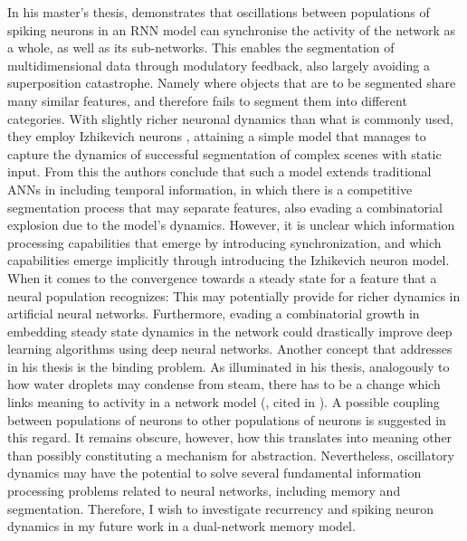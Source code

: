 In his master's thesis, \cite{Solbakken2009} demonstrates that oscillations between populations of spiking neurons in an RNN model can synchronise the activity of the network as a whole, as well as its sub-networks. This enables the segmentation of multidimensional data through modulatory feedback, also largely avoiding a superposition catastrophe. Namely where objects that are to be segmented share many similar features, and therefore fails to segment them into different categories. With slightly richer neuronal dynamics than what is commonly used, they employ Izhikevich neurons \citep{Izhikevich2003}, attaining a simple model that manages to capture the dynamics of successful segmentation of complex scenes with static input. From this the authors conclude that such a model extends traditional ANNs in including temporal information, in which there is a competitive segmentation process that may separate features, also evading a combinatorial explosion due to the model's dynamics. However, it is unclear which information processing capabilities that emerge by introducing synchronization, and which capabilities emerge implicitly through introducing the Izhikevich neuron model. When it comes to the convergence towards a steady state for a feature that a neural population recognizes: This may potentially provide for richer dynamics in artificial neural networks. Furthermore, evading a combinatorial growth in embedding steady state dynamics in the network could drastically improve deep learning algorithms using deep neural networks. Another concept that \cite{Solbakken2009} addresses in his thesis is the binding problem. As illuminated in his thesis, analogously to how water droplets may condense from steam,  there has to be a change which links meaning to activity in a network model (\cite{Freeman2003}, cited in \cite{Solbakken2009}). A possible coupling between populations of neurons to other populations of neurons is suggested in this regard. It remains obscure, however, how this translates into meaning other than possibly constituting a mechanism for abstraction. Nevertheless, oscillatory dynamics may have the potential to solve several fundamental information processing problems related to neural networks, including memory and segmentation. Therefore, I wish to investigate recurrency and spiking neuron dynamics in my future work in a dual-network memory model.


